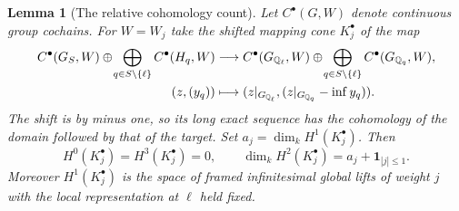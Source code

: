 \documentclass[a4paper,11pt]{article}
\newtheorem{lemma}[proposition]{Lemma}
\theoremstyle{definition}
\theoremstyle{remark}
\numberwithin{equation}{section}
\begin{document}
\begin{lemma}[The relative cohomology count]\label{lem:rel70}
Let \(C^\bullet(G,W)\) denote continuous group cochains.
For \(W=W_j\) take the shifted mapping cone \(K_j^\bullet\)
of the map
\begin{align*}
 C^\bullet(G_S,W)\oplus\!
      \bigoplus_{q\in S\setminus\{\ell\}} C^\bullet(H_q,W)
 &\longrightarrow C^\bullet(G_{\mathbb Q_\ell},W)\oplus\!
      \bigoplus_{q\in S\setminus\{\ell\}} C^\bullet(G_{\mathbb Q_q},W),\\
 (z,(y_q))&\longmapsto
       (z|_{G_{\mathbb Q_\ell}},(z|_{G_{\mathbb Q_q}}-\operatorname{inf}y_q)).
\end{align*}
The shift is by minus one, so its long exact sequence has the
cohomology of the domain followed by that of the target.
Set \(a_j=\dim_k H^1(K_j^\bullet)\). Then
\begin{equation}
   H^0(K_j^\bullet)=H^3(K_j^\bullet)=0,\qquad
   \dim_k H^2(K_j^\bullet)=a_j+\mathbf 1_{|j|\le1}.
                                                      \label{eq:rel70}
\end{equation}
Moreover \(H^1(K_j^\bullet)\) is the space of framed
infinitesimal global lifts of weight \(j\) with the local
representation at \(\ell\) held fixed.
\end{lemma}
\end{document}
